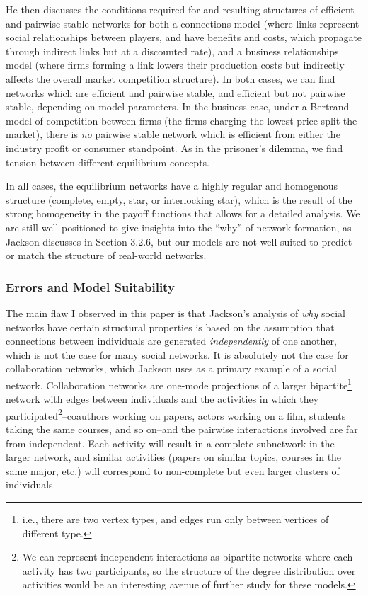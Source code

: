 \documentclass[11pt]{article}
\begin{document}
He then discusses the conditions required for and resulting structures of efficient and pairwise stable networks for both a connections model (where links represent social relationships between players, and have benefits and costs, which propagate through indirect links but at a discounted rate), and a business relationships model (where firms forming a link lowers their production costs but indirectly affects the overall market competition structure). In both cases, we can find networks which are efficient and pairwise stable, and efficient but not pairwise stable, depending on model parameters. In the business case, under a Bertrand model of competition between firms (the firms charging the lowest price split the market), there is \textit{no} pairwise stable network which is efficient from either the industry profit or consumer standpoint. As in the prisoner's dilemma, we find tension between different equilibrium concepts.

In all cases, the equilibrium networks have a highly regular and homogenous structure (complete, empty, star, or interlocking star), which is the result of the strong homogeneity in the payoff functions that allows for a detailed analysis. We are still well-positioned to give insights into the ``why'' of network formation, as Jackson discusses in Section 3.2.6, but our models are not well suited to predict or match the structure of real-world networks.

\subsubsection*{Errors and Model Suitability}

The main flaw I observed in this paper is that Jackson's analysis of \textit{why} social networks have certain structural properties is based on the assumption that connections between individuals are generated \textit{independently} of one another, which is not the case for many social networks. It is absolutely not the case for collaboration networks, which Jackson uses as a primary example of a social network. Collaboration networks are one-mode projections of a larger bipartite\footnote{i.e., there are two vertex types, and edges run only between vertices of different type.} network with edges between individuals and the activities in which they participated\footnote{We can represent independent interactions as bipartite networks where each activity has two participants, so the structure of the degree distribution over activities would be an interesting avenue of further study for these models.}--coauthors working on papers, actors working on a film, students taking the same courses, and so on--and the pairwise interactions involved are far from independent. Each activity will result in a complete subnetwork in the larger network, and similar activities (papers on similar topics, courses in the same major, etc.) will correspond to non-complete but even larger clusters of individuals. 
\end{document}
